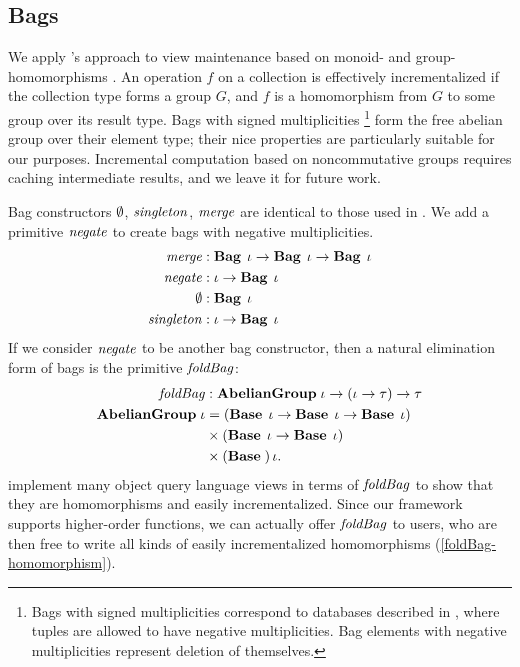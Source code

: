 \begin{oldSec}
\subsection{Bags}

We apply \citeauthor{GlucheGrust97Incr}'s approach to view
maintenance based on monoid- and group-homomorphisms
\citep{GlucheGrust97Incr}. An operation $f$ on a collection is
effectively incrementalized if the collection type forms a group
$G$, and $f$ is a homomorphism from $G$ to some group over its
result type. Bags with signed multiplicities%
%
\footnote{Bags with signed multiplicities correspond to databases
described in \citet{Koch10IQE}, where tuples are allowed to have
negative multiplicities. Bag elements with negative
multiplicities represent deletion of themselves.}
%
form the free abelian group over their element type; their nice
properties are particularly suitable for our purposes.
Incremental computation based on noncommutative groups requires
caching intermediate results, and we leave it for future work.

Bag constructors $\Empty$, $\mathit{singleton}$, $\mathit{merge}$ are identical
to those used in \citet{GlucheGrust97Incr}. We add a primitive
$\mathit{negate}$ to create bags with negative multiplicities.
\begin{align*}
\HasTypeAligned{\MERGE}
  {\Fun{\Fun{\Bag[\Gi]}{\Bag[\Gi]}}{\Bag[\Gi]}}
\\
\HasTypeAligned{\NEGATE}
  {\Fun{\Gi}{\Bag[\Gi]}}
\\
\HasTypeAligned{\Empty}
  {\Bag[\Gi]}
\\
\HasTypeAligned{\SINGLETON}
  {\Fun{\Gi}{\Bag[\Gi]}}
\end{align*}
If we consider $\mathit{negate}$ to be another bag constructor, then a
natural elimination form of bags is the primitive $\mathit{foldBag}$:
\begin{align*}
\HasTypeAligned\FOLDBAG
  {\Fun {\Abelian \Gi}
    {\Fun {\Fun*{\Gi}{\Gt}} {\Gt}}}
\\
\Abelian\Gi
  & =      \Fun*{\Base\Gi}{\Fun{\Base\Gi}{\Base\Gi}} \\
  & \times \Fun*{\Base\Gi}{\Base\Gi} \\
  & \times \Base*\Gi.
\end{align*}
\citet{GlucheGrust97Incr} implement many object query language
views in terms of $\mathit{foldBag}$ to show that they are
homomorphisms and easily incrementalized. Since our framework
supports higher-order functions, we can actually offer
$\mathit{foldBag}$ to users, who are then free to write all kinds of
easily incrementalized homomorphisms
(\cref{foldBag-homomorphism}).


\end{oldSec}
